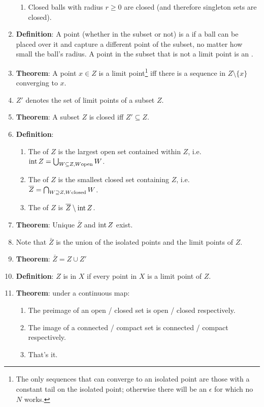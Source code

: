\begin{enumerate}
\begin{enumerate}[label=(\roman*)]
  \item Closed balls with radius $r \geq 0$ are closed (and therefore singleton sets are closed).
  \end{enumerate}
\item {\bf Definition}: A point (whether in the subset or not) is a  if a ball can
  be placed over it and capture a different point of the subset, no matter how small the ball's
  radius. A point in the subset that is not a limit point is an .
\item {\bf Theorem}: A point $x \in Z$ is a limit point\footnote{The only sequences that can
    converge to an isolated point are those with a constant tail on the isolated point; otherwise
    there will be an $\epsilon$ for which no $N$ works.} iff there is a sequence in
  $Z \setminus \{x\}$ converging to $x$.
\item $Z'$ denotes the set of limit points of a subset $Z$.
\item {\bf Theorem}: A subset $Z$ is closed iff $Z' \subseteq Z$.
\item {\bf Definition}:
  \begin{enumerate}[label=(\roman*)]
  \item The  of $Z$ is the largest open set contained within $Z$, i.e.
    $\interior Z = \bigcup_{W \subseteq Z,\\W \text{open}} W$.
  \item The  of $Z$ is the smallest closed set containing $Z$, i.e.
    $\bar Z = \bigcap_{W \supseteq Z,\\W \text{closed}} W$.
  \item The  of $Z$ is $\bar Z \setminus \interior Z$.
  \end{enumerate}
\item {\bf Theorem}: Unique $\bar Z$ and $\interior Z$ exist. 
\item Note that $\bar Z$ is the union of the isolated points and the limit points of $Z$.
\item {\bf Theorem}: $\bar Z = Z \cup Z'$
\item {\bf Definition}: $Z$ is  in $X$ if every point in $X$ is a limit point of $Z$.
\item {\bf Theorem}: under a continuous map:
  \begin{enumerate}[label=(\roman*)]
  \item The preimage of an open / closed set is open / closed respectively.
  \item The image of a connected / compact set is connected / compact respectively.
  \item That's it.
  \end{enumerate}
\end{enumerate}

